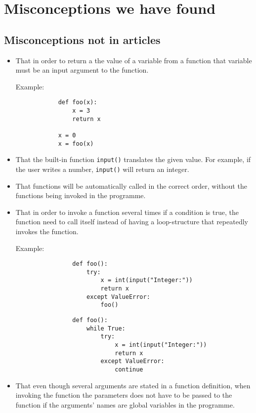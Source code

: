 \section{Misconceptions we have found}

\subsection{Misconceptions not in articles}

    \begin{itemize}
        \item That in order to return a the value of a variable from a 
function that variable must be an input argument to the function.
    
        Example:
            \hfill
            \begin{verbatim}
            def foo(x):
                x = 3
                return x
        
            x = 0
            x = foo(x)
            \end{verbatim}
            \hfill

        \item That the built-in function \texttt{input()} 
translates the given value. For example, if the user writes a 
number, \texttt{input()} will return an integer. 

        \item That functions will be automatically called in the correct 
order, without the functions being invoked in the programme. 

        \item That in order to invoke a function several times if a 
condition is true, the function need to call itself instead of 
having a loop-structure that repeatedly invokes the function. 

        Example:
            \hfill
            \begin{minipage}[t]{0.45\columnwidth}
            \begin{verbatim}
                def foo():
                    try:
                        x = int(input("Integer:"))
                        return x
                    except ValueError:
                        foo()
            \end{verbatim}
            \end{minipage}
            \hfill
            \begin{minipage}[t]{0.45\columnwidth}
            \begin{verbatim}
                def foo():
                    while True:
                        try:
                            x = int(input("Integer:"))
                            return x
                        except ValueError:
                            continue
            \end{verbatim}
            \end{minipage}
        \item That even though several arguments are stated in a function 
definition, when invoking the function the parameters does not have 
to be passed to the function if the arguments' names are global 
variables in the programme.


\end{itemize}
